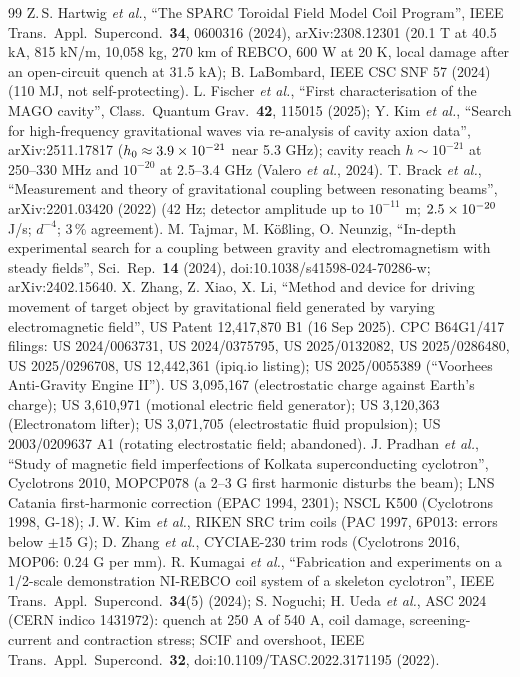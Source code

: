 \begin{thebibliography}{99}
 Z.\,S. Hartwig \emph{et al.}, ``The SPARC Toroidal Field Model Coil Program'', IEEE Trans.\ Appl.\ Supercond.\ \textbf{34}, 0600316 (2024), arXiv:2308.12301 (20.1 T at 40.5 kA, 815 kN/m, 10,058 kg, 270 km of REBCO, 600 W at 20 K, local damage after an open-circuit quench at 31.5 kA); B. LaBombard, IEEE CSC SNF 57 (2024) (110 MJ, not self-protecting).
 L. Fischer \emph{et al.}, ``First characterisation of the MAGO cavity'', Class.\ Quantum Grav.\ \textbf{42}, 115015 (2025); Y. Kim \emph{et al.}, ``Search for high-frequency gravitational waves via re-analysis of cavity axion data'', arXiv:2511.17817 ($h_0\approx3.9\times10^{-21}$ near 5.3 GHz); cavity reach $h\sim10^{-21}$ at 250--330 MHz and $10^{-20}$ at 2.5--3.4 GHz (Valero \emph{et al.}, 2024).
 T. Brack \emph{et al.}, ``Measurement and theory of gravitational coupling between resonating beams'', arXiv:2201.03420 (2022) (42 Hz; detector amplitude up to $10^{-11}$ m; $2.5\times10^{-20}$ J/s; $d^{-4}$; 3\,\% agreement).
 M. Tajmar, M. K\"o{\ss}ling, O. Neunzig, ``In-depth experimental search for a coupling between gravity and electromagnetism with steady fields'', Sci.\ Rep.\ \textbf{14} (2024), doi:10.1038/s41598-024-70286-w; arXiv:2402.15640.
 X. Zhang, Z. Xiao, X. Li, ``Method and device for driving movement of target object by gravitational field generated by varying electromagnetic field'', US Patent 12,417,870 B1 (16 Sep 2025).
 CPC B64G1/417 filings: US 2024/0063731, US 2024/0375795, US 2025/0132082, US 2025/0286480, US 2025/0296708, US 12,442,361 (ipiq.io listing); US 2025/0055389 (``Voorhees Anti-Gravity Engine II'').
 US 3,095,167 (electrostatic charge against Earth's charge); US 3,610,971 (motional electric field generator); US 3,120,363 (Electronatom lifter); US 3,071,705 (electrostatic fluid propulsion); US 2003/0209637 A1 (rotating electrostatic field; abandoned).
 J. Pradhan \emph{et al.}, ``Study of magnetic field imperfections of Kolkata superconducting cyclotron'', Cyclotrons 2010, MOPCP078 (a 2--3 G first harmonic disturbs the beam); LNS Catania first-harmonic correction (EPAC 1994, 2301); NSCL K500 (Cyclotrons 1998, G-18); J.\,W. Kim \emph{et al.}, RIKEN SRC trim coils (PAC 1997, 6P013: errors below $\pm$15 G); D. Zhang \emph{et al.}, CYCIAE-230 trim rods (Cyclotrons 2016, MOP06: 0.24 G per mm).
 R. Kumagai \emph{et al.}, ``Fabrication and experiments on a 1/2-scale demonstration NI-REBCO coil system of a skeleton cyclotron'', IEEE Trans.\ Appl.\ Supercond.\ \textbf{34}(5) (2024); S. Noguchi; H. Ueda \emph{et al.}, ASC 2024 (CERN indico 1431972): quench at 250 A of 540 A, coil damage, screening-current and contraction stress; SCIF and overshoot, IEEE Trans.\ Appl.\ Supercond.\ \textbf{32}, doi:10.1109/TASC.2022.3171195 (2022).

\end{thebibliography}
